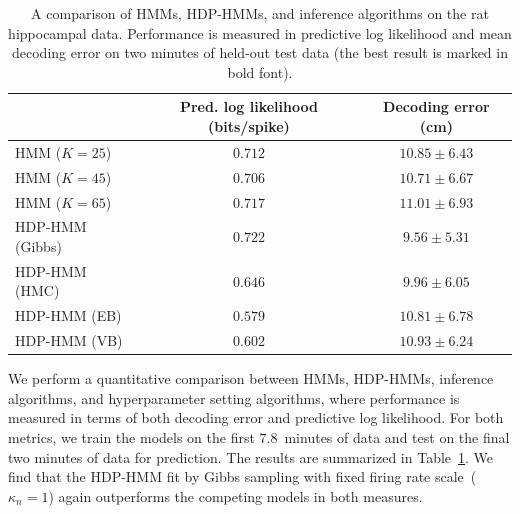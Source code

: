 \begin{table}[b]
  \centering
  \caption[Comparison of models on real hippocampal data]{A comparison
    of HMMs, HDP-HMMs, and inference algorithms on the rat hippocampal
    data. Performance is measured in predictive log likelihood and
    mean decoding error on two minutes of held-out test data (the best
    result is marked in bold font).}
  \begin{tabular}{l|cc}
    & Pred. log likelihood (bits/spike) & Decoding error (cm) \\
    \hline 
    HMM ($K=25$)         & $0.712$ & $10.85 \pm 6.43$ \\
    HMM ($K=45$)         & $0.706$ & $10.71 \pm 6.67$\\
    HMM ($K=65$)         & $0.717$ & $11.01 \pm 6.93$\\
    HDP-HMM (Gibbs)      & $\mathbf{0.722}$ & $\mathbf{9.56 \pm 5.31}$ \\
    HDP-HMM (HMC)        & $0.646$ & $9.96 \pm 6.05$\\
    HDP-HMM (EB)         & $0.579$ & $10.81 \pm 6.78$\\
    HDP-HMM (VB)         & $0.602$ & $10.93 \pm 6.24$
  \end{tabular}
  \label{tab:hipp_err}
\end{table}

We perform a quantitative comparison between HMMs, HDP-HMMs, inference
algorithms, and hyperparameter setting algorithms, where performance
is measured in terms of both decoding error and predictive log
likelihood. For both metrics, we train the models on the first
$7.8$~minutes of data and test on the final two minutes of data for
prediction. The results are summarized in Table~\ref{tab:hipp_err}. We
find that the HDP-HMM fit by Gibbs sampling with fixed firing rate
scale~($\kappa_n=1$) again outperforms the competing models in both
measures.

